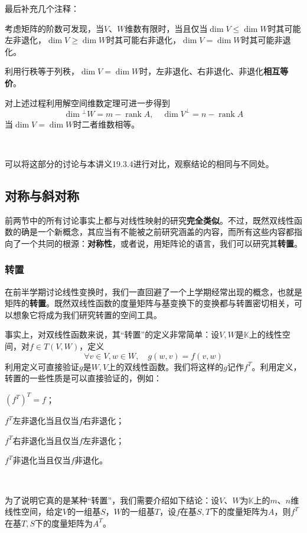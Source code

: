 \documentclass[a4paper,UTF8,fontset=windows,AutoFakeBold]{ctexart}
\DeclareMathOperator{\rank}{rank}
\newcommand*{\note}{\noindent *}
\begin{document}
最后补充几个注释：
\begin{compactitem}
    \item 考虑矩阵的阶数可发现，当$V$、$W$维数有限时，当且仅当$\dim V\le\dim W$时其可能左非退化，$\dim V\ge\dim W$时其可能右非退化，$\dim V=\dim W$时其可能非退化。
    \item 利用行秩等于列秩，$\dim V=\dim W$时，左非退化、右非退化、非退化\textbf{相互等价}。
    \item 对上述过程利用解空间维数定理可进一步得到
    $$\dim{}^\bot W=m-\rank A,\quad\dim V^\bot=n-\rank A$$
    当$\dim V=\dim W$时二者维数相等。
\end{compactitem}

\

\note 可以将这部分的讨论与本讲义19.3.4进行对比，观察结论的相同与不同处。

\subsection{对称与斜对称}
前两节中的所有讨论事实上都与对线性映射的研究\textbf{完全类似}。不过，既然双线性函数的确是一个新概念，其应当有不能被之前研究涵盖的内容，而所有这些内容都指向了一个共同的根源：\textbf{对称性}，或者说，用矩阵论的语言，我们可以研究其\textbf{转置}。

\subsubsection{转置}
在前半学期讨论线性变换时，我们一直回避了一个上学期经常出现的概念，也就是矩阵的\textbf{转置}。既然双线性函数的度量矩阵与基变换下的变换都与转置密切相关，可以想象它将成为我们研究转置的空间工具。

事实上，对双线性函数来说，其``转置''的定义非常简单：设$V,W$是$\mathbb{K}$上的线性空间，对$f\in T(V,W)$，定义
$$\forall v\in V,w\in W,\quad g(w,v)=f(v,w)$$
利用定义可直接验证$g$是$W,V$上的双线性函数。我们将这样的$g$记作$f^T$。利用定义，转置的一些性质是可以直接验证的，例如：
\begin{compactitem}
    \item $(f^T)^T=f$；
    \item $f^T$左非退化当且仅当$f$右非退化；
    \item $f^T$右非退化当且仅当$f$左非退化；
    \item $f^T$非退化当且仅当$f$非退化。
\end{compactitem}

\

为了说明它真的是某种``转置''，我们需要介绍如下结论：设$V$、$W$为$\mathbb{K}$上的$m$、$n$维线性空间，给定$V$的一组基$S$，$W$的一组基$T$，设$f$在基$S,T$下的度量矩阵为$A$，则$f^T$在基$T,S$下的度量矩阵为$A^T$。
\end{document}
